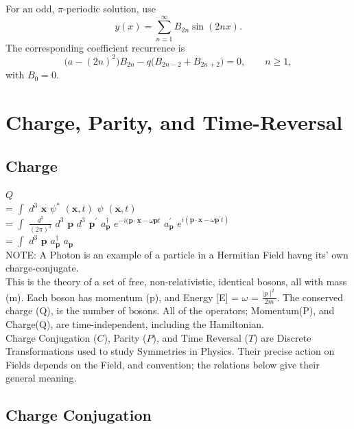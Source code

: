 \documentclass[a4paper, 10pt, onepage]{elegantbook}
\begin{document}
For an odd, \(\pi\)-periodic solution, use
\[
y(x)=\sum_{n=1}^{\infty}B_{2n}\sin(2nx).
\]
The corresponding coefficient recurrence is
\[
\bigl(a-(2n)^2\bigr)B_{2n}
-q\bigl(B_{2n-2}+B_{2n+2}\bigr)=0,
\qquad n\geq 1,
\]
with \(B_0=0\).


\section{Charge, Parity, and Time-Reversal}

\subsection{Charge}

$Q$  \\
= $\int$ $d^{3}$ $\mathbf{\textbf{x}}$ $\psi^{*}$ $(\mathbf{\textbf{x}}, t)$ $\psi$ $(\mathbf{x}, t)$ \\
= $\int$ $\frac{d^{3}}{(2 \pi)^3}$ $d^{3}$ $\mathbf{\textbf{p}}$ $d^{3}$ $\mathbf{\textbf{p}}^{\prime}$ $a^{\dagger}_\mathbf{\textbf{p}}$ $e^{-i(\mathbf{\textbf{p}}
\cdot \mathbf{\textbf{x}} - \omega \mathbf{\textbf{p}}t}$ $a_\mathbf{\textbf{p}}^{\prime}$ $e^{i(\mathbf{\textbf{p}} \cdot \mathbf{\textbf{x}} - \omega \mathbf{\textbf{p}}^{\prime}t)}$ \\
= $\int$ $d^{3}$ $\mathbf{\textbf{p}}$ $a^{\dagger}_\mathbf{\textbf{p}}$ $a_\mathbf{\textbf{p}}$  \\

NOTE: A Photon is an example of a particle in a Hermitian Field havng its' own charge-conjugate. \\

This is the theory of a set of free, non-relativistic, identical bosons, all with mass (m). Each boson has momentum (p), and Energy [E] = $\omega$ = $\frac{\mid p \mid^2}{2m}$. The conserved charge (Q), is the number of bosons. All of the operators; Momentum(P), and Charge(Q), are time-independent, including the Hamiltonian. \\


Charge Conjugation (\(C\)), Parity (\(P\)), and Time Reversal (\(T\)) are Discrete Transformations used to study Symmetries in Physics. Their precise action on Fields depends on the Field, and convention; the relations below give their general meaning.

\subsection{Charge Conjugation}
\end{document}

